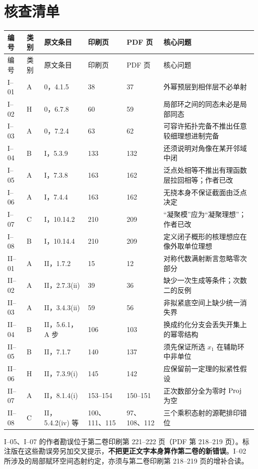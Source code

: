\chapter{核查清单}
\small
\setlength{\tabcolsep}{2.4pt}
\begin{longtable}{@{}p{}p{}p{}p{}p{}p{}@{}}
\toprule
编号 & 类别 & 原文条目 & 印刷页 & PDF 页 & 核心问题\\\midrule
\endfirsthead
\toprule 编号 & 类别 & 原文条目 & 印刷页 & PDF 页 & 核心问题\\\midrule\endhead
I--01&A&0，4.1.5&38&37&外幂预层到相伴层不必单射\\
I--02&H&0，6.7.8&60&59&局部环之间的同态未必是局部同态\\
I--03&A&0，7.2.4&63&62&可容许拓扑完备不推出任意较细理想进制完备\\
I--04&B&I，5.3.9&133&132&还须说明对角像在某开邻域中闭\\
I--05&A&I，7.3.8&163&162&泛点处相等不推出有理函数层拉回相等；作者已改\\
I--06&A&I，7.4.4&163&162&无挠本身不保证截面由泛点决定\\
I--07&C&I，10.14.2&210&209&“凝聚模”应为“凝聚理想”；作者已改\\
I--08&B&I，10.14.4&210&209&定义闭子概形的核理想应在像外取单位理想\\\midrule
II--01&A&II，1.7.2&15&12&对称代数满射断言忽略零次部分\\
II--02&A&II，2.7.3(ii)&39&36&缺少一次生成等条件；次数二的反例\\
II--03&A&II，3.4.3(ii)&59&56&非拟紧底空间上缺少统一消失界\\
II--04&B&II，5.6.1，A 步&106&103&换成约化分支会丢失开集上的幂零结构\\
II--05&B&II，7.1.7&140&137&须先保证所选 $x_1$ 在辅助环中非单位\\
II--06&H&II，7.3.9(i)&145&142&应保留前一定理的拟紧性假设\\
II--07&A&II，8.1.4(i)&153--154&150--151&正次数部分全为零时 $\operatorname{Proj}$ 为空\\
II--08&C&II，5.4.2(iv) 等&100、111、115&97、108、112&三个乘积态射的源靶排印错位\\
\bottomrule
\end{longtable}
\normalsize

I--05、I--07 的作者勘误位于第二卷印刷第 221--222 页（PDF 第 218--219 页）。标注版在这些勘误旁另加交叉提示，\textbf{不把更正文字本身算作第二卷的新错误}。I--02 所涉及的局部赋环空间态射约定，亦须与第二卷印刷第 218--219 页的增补合读。

